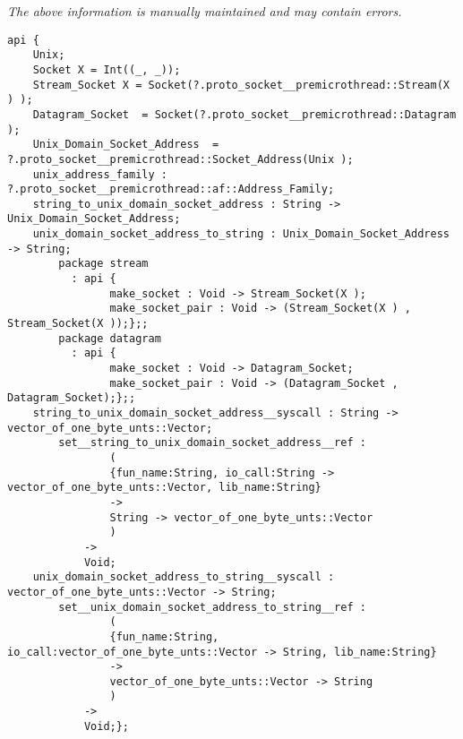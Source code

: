 \label{api:Unix\_Domain\_Socket\_\_Premicrothread}

{\tiny \it The above information is manually maintained and may contain errors.}
\begin{verbatim}
api {
    Unix;
    Socket X = Int((_, _));
    Stream_Socket X = Socket(?.proto_socket__premicrothread::Stream(X ) );
    Datagram_Socket  = Socket(?.proto_socket__premicrothread::Datagram );
    Unix_Domain_Socket_Address  = ?.proto_socket__premicrothread::Socket_Address(Unix );
    unix_address_family : ?.proto_socket__premicrothread::af::Address_Family;
    string_to_unix_domain_socket_address : String -> Unix_Domain_Socket_Address;
    unix_domain_socket_address_to_string : Unix_Domain_Socket_Address -> String;
        package stream
          : api {
                make_socket : Void -> Stream_Socket(X );
                make_socket_pair : Void -> (Stream_Socket(X ) , Stream_Socket(X ));};;
        package datagram
          : api {
                make_socket : Void -> Datagram_Socket;
                make_socket_pair : Void -> (Datagram_Socket , Datagram_Socket);};;
    string_to_unix_domain_socket_address__syscall : String -> vector_of_one_byte_unts::Vector;
        set__string_to_unix_domain_socket_address__ref :
                (
                {fun_name:String, io_call:String -> vector_of_one_byte_unts::Vector, lib_name:String}
                ->
                String -> vector_of_one_byte_unts::Vector
                )
            ->
            Void;
    unix_domain_socket_address_to_string__syscall : vector_of_one_byte_unts::Vector -> String;
        set__unix_domain_socket_address_to_string__ref :
                (
                {fun_name:String, io_call:vector_of_one_byte_unts::Vector -> String, lib_name:String}
                ->
                vector_of_one_byte_unts::Vector -> String
                )
            ->
            Void;};
\end{verbatim}
